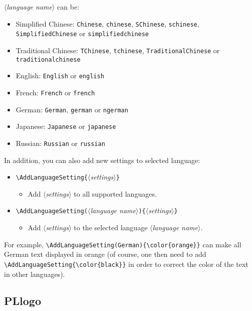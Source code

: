 \documentclass[allowbf]{lebhart}
\providecommand{\meta}[1]{$\langle${\normalfont\itshape#1}$\rangle$}
\begin{document}
\meta{language name} can be:
\begin{itemize}
    \item Simplified Chinese: \texttt{Chinese}, \texttt{chinese}, \texttt{SChinese}, \texttt{schinese}, \texttt{SimplifiedChinese} or \texttt{simplifiedchinese}
    \item Traditional Chinese: \texttt{TChinese}, \texttt{tchinese}, \texttt{TraditionalChinese} or \texttt{traditionalchinese}
    \item English: \texttt{English} or \texttt{english}
    \item French: \texttt{French} or \texttt{french}
    \item German: \texttt{German}, \texttt{german} or \texttt{ngerman}
    \item Japanese: \texttt{Japanese} or \texttt{japanese}
    \item Russian: \texttt{Russian} or \texttt{russian}
\end{itemize}

\medskip
In addition, you can also add new settings to selected language:
\begin{itemize}
    \item \lstinline|\AddLanguageSetting{|\meta{settings}\lstinline|}|
    \begin{itemize}
        \item Add \meta{settings} to all supported languages.
    \end{itemize}
    \item \lstinline|\AddLanguageSetting(|\meta{language name}\lstinline|){|\meta{settings}\lstinline|}|
    \begin{itemize}
        \item Add \meta{settings} to the selected language \meta{language name}.
    \end{itemize}
\end{itemize}
For example, \lstinline|\AddLanguageSetting(German){\color{orange}}| can make all German text displayed in orange (of course, one then need to add \lstinline|\AddLanguageSetting{\color{black}}| in order to correct the color of the text in other languages).


\subsection{PLlogo}
\end{document}
